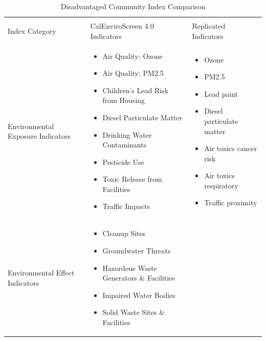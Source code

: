 \begin{table}
    \centering
    \caption{Disadvantaged Community Index Comparison}
    \small
    \begin{tabular}{L{0.2\textwidth} L{0.35\textwidth} L{0.35\textwidth}}
        \hline\hline \\ [-1.8ex]
        Index Category & CalEnviroScreen 4.0 Indicators & Replicated Indicators\\
        \hline
        Environmental Exposure Indicators & 
        \begin{itemize}[noitemsep, topsep=0pt]
            \item Air Quality: Ozone
            \item Air Quality: PM2.5
            \item Children's Lead Risk from Housing
            \item Diesel Particulate Matter
            \item Drinking Water Contaminants
            \item Pesticide Use
            \item Toxic Release from Facilities
            \item Traffic Impacts 
        \end{itemize} &
        \begin{itemize}[noitemsep, topsep=0pt]
            \item Ozone
            \item PM2.5
            \item Lead paint
            \item Diesel particulate matter
            \item Air toxics cancer risk
            \item Air toxics respiratory
            \item Traffic proximity
        \end{itemize} \\
        \hline
        Environmental Effect Indicators &
        \begin{itemize}[noitemsep, topsep=0pt]
            \item Cleanup Sites
            \item Groundwater Threats
            \item Hazardous Waste Generators \& Facilities
            \item Impaired Water Bodies
            \item Solid Waste Sites \& Facilities
        \end{itemize} &

\end{tabular}
\end{table}
